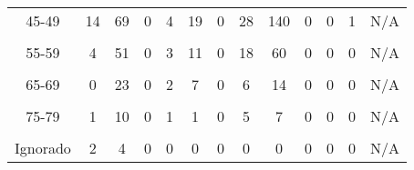 \begin{tabular}[t]{ccccccccccccc}
45-49 & 14 & 69 & 0 & 4 & 19 & 0 & 28 & 140 & 0 & 0 & 1 & N/A\\
\cellcolor[HTML]{B6B3FF}{50-54} & \cellcolor[HTML]{B6B3FF}{5} & \cellcolor[HTML]{B6B3FF}{46} & \cellcolor[HTML]{B6B3FF}{0} & \cellcolor[HTML]{B6B3FF}{2} & \cellcolor[HTML]{B6B3FF}{10} & \cellcolor[HTML]{B6B3FF}{0} & \cellcolor[HTML]{B6B3FF}{20} & \cellcolor[HTML]{B6B3FF}{97} & \cellcolor[HTML]{B6B3FF}{0} & \cellcolor[HTML]{B6B3FF}{0} & \cellcolor[HTML]{B6B3FF}{0} & \cellcolor[HTML]{B6B3FF}{N/A}\\
55-59 & 4 & 51 & 0 & 3 & 11 & 0 & 18 & 60 & 0 & 0 & 0 & N/A\\
\cellcolor[HTML]{B6B3FF}{60-64} & \cellcolor[HTML]{B6B3FF}{1} & \cellcolor[HTML]{B6B3FF}{36} & \cellcolor[HTML]{B6B3FF}{0} & \cellcolor[HTML]{B6B3FF}{1} & \cellcolor[HTML]{B6B3FF}{9} & \cellcolor[HTML]{B6B3FF}{0} & \cellcolor[HTML]{B6B3FF}{5} & \cellcolor[HTML]{B6B3FF}{49} & \cellcolor[HTML]{B6B3FF}{0} & \cellcolor[HTML]{B6B3FF}{0} & \cellcolor[HTML]{B6B3FF}{0} & \cellcolor[HTML]{B6B3FF}{N/A}\\
65-69 & 0 & 23 & 0 & 2 & 7 & 0 & 6 & 14 & 0 & 0 & 0 & N/A\\
\cellcolor[HTML]{B6B3FF}{70-74} & \cellcolor[HTML]{B6B3FF}{2} & \cellcolor[HTML]{B6B3FF}{17} & \cellcolor[HTML]{B6B3FF}{0} & \cellcolor[HTML]{B6B3FF}{2} & \cellcolor[HTML]{B6B3FF}{6} & \cellcolor[HTML]{B6B3FF}{0} & \cellcolor[HTML]{B6B3FF}{2} & \cellcolor[HTML]{B6B3FF}{10} & \cellcolor[HTML]{B6B3FF}{0} & \cellcolor[HTML]{B6B3FF}{0} & \cellcolor[HTML]{B6B3FF}{0} & \cellcolor[HTML]{B6B3FF}{N/A}\\
75-79 & 1 & 10 & 0 & 1 & 1 & 0 & 5 & 7 & 0 & 0 & 0 & N/A\\
\cellcolor[HTML]{B6B3FF}{80 y más} & \cellcolor[HTML]{B6B3FF}{2} & \cellcolor[HTML]{B6B3FF}{10} & \cellcolor[HTML]{B6B3FF}{0} & \cellcolor[HTML]{B6B3FF}{0} & \cellcolor[HTML]{B6B3FF}{3} & \cellcolor[HTML]{B6B3FF}{0} & \cellcolor[HTML]{B6B3FF}{0} & \cellcolor[HTML]{B6B3FF}{8} & \cellcolor[HTML]{B6B3FF}{1} & \cellcolor[HTML]{B6B3FF}{0} & \cellcolor[HTML]{B6B3FF}{0} & \cellcolor[HTML]{B6B3FF}{N/A}\\
Ignorado & 2 & 4 & 0 & 0 & 0 & 0 & 0 & 0 & 0 & 0 & 0 & N/A\\
\bottomrule
\end{tabular}
